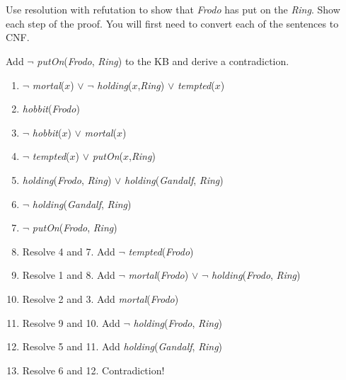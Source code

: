 \documentclass[paper=a4, fontsize=11pt]{scrartcl} %
\begin{document}
\section{}

\begin{fancyquotes}
  Use resolution with refutation to show that \textit{Frodo} has put
  on the \textit{Ring}. Show each step of the proof. You will first
  need to convert each of the sentences to CNF.

  Add $\lnot$ \textit{putOn}(\textit{Frodo}, \textit{Ring}) to the KB
  and derive a contradiction.
\end{fancyquotes}

\begin{enumerate}
\item $\lnot$ \textit{mortal}($x$) $\lor$ $\lnot$
  \textit{holding}($x$,\textit{Ring}) $\lor$ \textit{tempted}($x$)
\item \textit{hobbit}(\textit{Frodo})
\item $\lnot$ \textit{hobbit}($x$) $\lor$ \textit{mortal}($x$)
\item $\lnot$ \textit{tempted}($x$) $\lor$ \textit{putOn}($x$,\textit{Ring})
\item \textit{holding}(\textit{Frodo}, \textit{Ring}) $\lor$
  \textit{holding}(\textit{Gandalf}, \textit{Ring})
\item $\lnot$ \textit{holding}(\textit{Gandalf}, \textit{Ring})
\item $\lnot$ \textit{putOn}(\textit{Frodo}, \textit{Ring})
\item Resolve 4 and 7. Add $\lnot$ \textit{tempted}(\textit{Frodo})
\item Resolve 1 and 8. Add $\lnot$ \textit{mortal}(\textit{Frodo})
  $\lor$ $\lnot$ \textit{holding}(\textit{Frodo}, \textit{Ring})
\item Resolve 2 and 3. Add \textit{mortal}(\textit{Frodo})
\item Resolve 9 and 10. Add $\lnot$ \textit{holding}(\textit{Frodo},
  \textit{Ring})
\item Resolve 5 and 11. Add \textit{holding}(\textit{Gandalf},
  \textit{Ring})
\item Resolve 6 and 12. Contradiction!
\end{enumerate}


\end{document}
